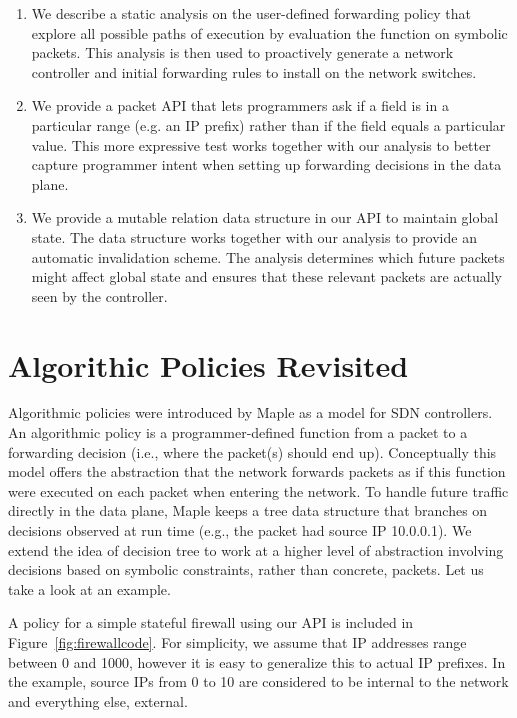 \documentclass[preprint]{sigplanconf}
\begin{document}
\begin{enumerate}
\item We describe a static analysis on the user-defined forwarding policy that explore all possible paths of execution by evaluation the function on symbolic packets. This analysis is then used to proactively generate a network controller and initial forwarding rules to install on the network switches.
\item We provide a packet API that lets programmers ask if a field is in a particular range (e.g. an IP prefix) rather than if the field equals a particular value. This more expressive test works together with our analysis to better capture programmer intent when setting up forwarding decisions in the data plane.
\item We provide a mutable relation data structure in our API to maintain global state. The data structure works together with our analysis to provide an automatic invalidation scheme. The analysis determines which future packets might affect global state and ensures that these relevant packets are actually seen by the controller.
\end{enumerate}



\section*{Algorithic Policies Revisited}
Algorithmic policies were introduced by Maple as a model for SDN controllers. An algorithmic policy is a programmer-defined function from a packet to a forwarding decision (i.e., where the packet(s) should end up). Conceptually this model offers the abstraction that the network forwards packets as if this function were executed on each packet when entering the network. To handle future traffic directly in the data plane, Maple keeps a tree data structure that branches on decisions observed at run time (e.g., the packet had source IP 10.0.0.1). We extend the idea of decision tree to work at a higher level of abstraction involving decisions based on symbolic constraints, rather than concrete, packets. Let us take a look at an example.


A policy for a simple stateful firewall using our API is included in Figure~\ref{fig:firewallcode}. For simplicity, we assume that IP addresses range between 0 and 1000, however it is easy to generalize this to actual IP prefixes.
In the example, source IPs from 0 to 10 are considered to be internal to the network and everything else, external. 
\end{document}
